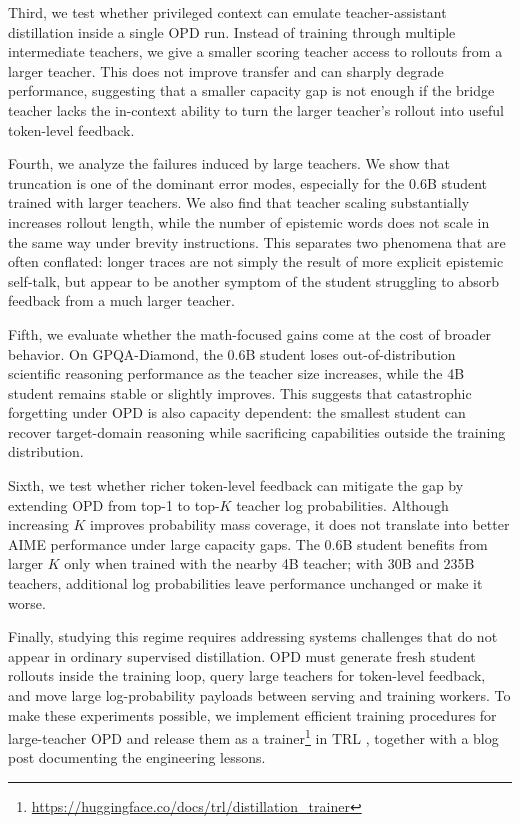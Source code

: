 Third, we test whether privileged context can emulate teacher-assistant distillation inside a single OPD run. Instead of training through multiple intermediate teachers, we give a smaller scoring teacher access to rollouts from a larger teacher. This does not improve transfer and can sharply degrade performance, suggesting that a smaller capacity gap is not enough if the bridge teacher lacks the in-context ability to turn the larger teacher's rollout into useful token-level feedback.

Fourth, we analyze the failures induced by large teachers. We show that truncation is one of the dominant error modes, especially for the 0.6B student trained with larger teachers. We also find that teacher scaling substantially increases rollout length, while the number of epistemic words does not scale in the same way under brevity instructions. This separates two phenomena that are often conflated: longer traces are not simply the result of more explicit epistemic self-talk, but appear to be another symptom of the student struggling to absorb feedback from a much larger teacher.

Fifth, we evaluate whether the math-focused gains come at the cost of broader behavior. On GPQA-Diamond, the 0.6B student loses out-of-distribution scientific reasoning performance as the teacher size increases, while the 4B student remains stable or slightly improves. This suggests that catastrophic forgetting under OPD is also capacity dependent: the smallest student can recover target-domain reasoning while sacrificing capabilities outside the training distribution.

Sixth, we test whether richer token-level feedback can mitigate the gap by extending OPD from top-1 to top-$K$ teacher log probabilities. Although increasing $K$ improves probability mass coverage, it does not translate into better AIME performance under large capacity gaps. The 0.6B student benefits from larger $K$ only when trained with the nearby 4B teacher; with 30B and 235B teachers, additional log probabilities leave performance unchanged or make it worse.

Finally, studying this regime requires addressing systems challenges that do not appear in ordinary supervised distillation. OPD must generate fresh student rollouts inside the training loop, query large teachers for token-level feedback, and move large log-probability payloads between serving and training workers. To make these experiments possible, we implement efficient training procedures for large-teacher OPD and release them as a trainer\footnote{\url{https://huggingface.co/docs/trl/distillation_trainer}} in TRL \citep{vonwerra2020trl}, together with a blog post \citep{patino2026_distilling_100b_models_40x_faster_with_trl} documenting the engineering lessons.

